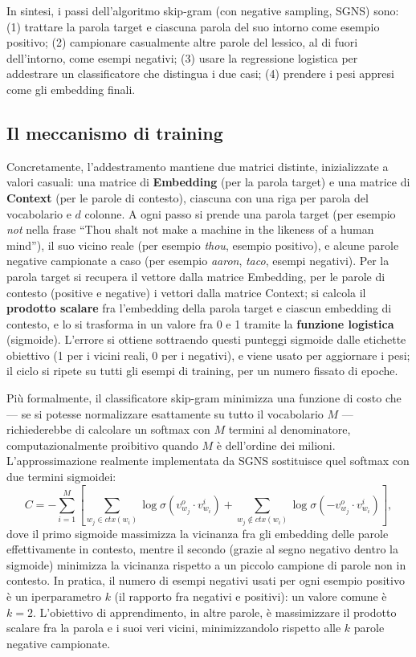 \documentclass[11pt,a4paper]{report}
\begin{document}
In sintesi, i passi dell'algoritmo skip-gram (con negative sampling, SGNS) sono: (1) trattare la parola target e ciascuna parola del suo intorno come esempio positivo; (2) campionare casualmente altre parole del lessico, al di fuori dell'intorno, come esempi negativi; (3) usare la regressione logistica per addestrare un classificatore che distingua i due casi; (4) prendere i pesi appresi come gli embedding finali.

\subsection{Il meccanismo di training}

Concretamente, l'addestramento mantiene due matrici distinte, inizializzate a valori casuali: una matrice di \textbf{Embedding} (per la parola target) e una matrice di \textbf{Context} (per le parole di contesto), ciascuna con una riga per parola del vocabolario e $d$ colonne. A ogni passo si prende una parola target (per esempio \emph{not} nella frase ``Thou shalt not make a machine in the likeness of a human mind''), il suo vicino reale (per esempio \emph{thou}, esempio positivo), e alcune parole negative campionate a caso (per esempio \emph{aaron}, \emph{taco}, esempi negativi). Per la parola target si recupera il vettore dalla matrice Embedding, per le parole di contesto (positive e negative) i vettori dalla matrice Context; si calcola il \textbf{prodotto scalare} fra l'embedding della parola target e ciascun embedding di contesto, e lo si trasforma in un valore fra 0 e 1 tramite la \textbf{funzione logistica} (sigmoide). L'errore si ottiene sottraendo questi punteggi sigmoide dalle etichette obiettivo (1 per i vicini reali, 0 per i negativi), e viene usato per aggiornare i pesi; il ciclo si ripete su tutti gli esempi di training, per un numero fissato di epoche.

Più formalmente, il classificatore skip-gram minimizza una funzione di costo che --- se si potesse normalizzare esattamente su tutto il vocabolario $M$ --- richiederebbe di calcolare un softmax con $M$ termini al denominatore, computazionalmente proibitivo quando $M$ è dell'ordine dei milioni. L'approssimazione realmente implementata da SGNS sostituisce quel softmax con due termini sigmoidei:
\[
C = -\sum_{i=1}^{M}\left[\sum_{w_j \in ctx(w_i)} \log \sigma(v^o_{w_j}\cdot v^i_{w_i}) + \sum_{w_j \notin ctx(w_i)} \log\sigma(-v^o_{w_j}\cdot v^i_{w_i})\right],
\]
dove il primo sigmoide massimizza la vicinanza fra gli embedding delle parole effettivamente in contesto, mentre il secondo (grazie al segno negativo dentro la sigmoide) minimizza la vicinanza rispetto a un piccolo campione di parole non in contesto. In pratica, il numero di esempi negativi usati per ogni esempio positivo è un iperparametro $k$ (il rapporto fra negativi e positivi): un valore comune è $k=2$. L'obiettivo di apprendimento, in altre parole, è massimizzare il prodotto scalare fra la parola e i suoi veri vicini, minimizzandolo rispetto alle $k$ parole negative campionate.
\end{document}
